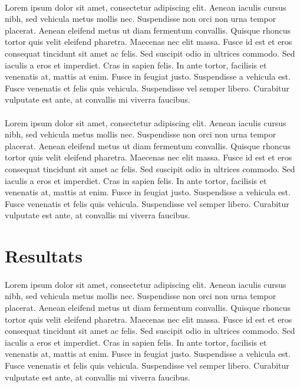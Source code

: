 \documentclass[11pt]{metabo}
\begin{document}
\paragraph{}Lorem ipsum dolor sit amet, consectetur adipiscing elit. Aenean iaculis cursus nibh, sed vehicula metus mollis nec. Suspendisse non orci non urna tempor placerat. Aenean eleifend metus ut diam fermentum convallis. Quisque rhoncus tortor quis velit eleifend pharetra. Maecenas nec elit massa. Fusce id est et eros consequat tincidunt sit amet ac felis. Sed suscipit odio in ultrices commodo. Sed iaculis a eros et imperdiet. Cras in sapien felis. In ante tortor, facilisis et venenatis at, mattis at enim. Fusce in feugiat justo. Suspendisse a vehicula est. Fusce venenatis et felis quis vehicula. Suspendisse vel semper libero. Curabitur vulputate est ante, at convallis mi viverra faucibus.
\paragraph{}Lorem ipsum dolor sit amet, consectetur adipiscing elit. Aenean iaculis cursus nibh, sed vehicula metus mollis nec. Suspendisse non orci non urna tempor placerat. Aenean eleifend metus ut diam fermentum convallis. Quisque rhoncus tortor quis velit eleifend pharetra. Maecenas nec elit massa. Fusce id est et eros consequat tincidunt sit amet ac felis. Sed suscipit odio in ultrices commodo. Sed iaculis a eros et imperdiet. Cras in sapien felis. In ante tortor, facilisis et venenatis at, mattis at enim. Fusce in feugiat justo. Suspendisse a vehicula est. Fusce venenatis et felis quis vehicula. Suspendisse vel semper libero. Curabitur vulputate est ante, at convallis mi viverra faucibus.
\newpage
\section{Resultats}
\paragraph{}Lorem ipsum dolor sit amet, consectetur adipiscing elit. Aenean iaculis cursus nibh, sed vehicula metus mollis nec. Suspendisse non orci non urna tempor placerat. Aenean eleifend metus ut diam fermentum convallis. Quisque rhoncus tortor quis velit eleifend pharetra. Maecenas nec elit massa. Fusce id est et eros consequat tincidunt sit amet ac felis. Sed suscipit odio in ultrices commodo. Sed iaculis a eros et imperdiet. Cras in sapien felis. In ante tortor, facilisis et venenatis at, mattis at enim. Fusce in feugiat justo. Suspendisse a vehicula est. Fusce venenatis et felis quis vehicula. Suspendisse vel semper libero. Curabitur vulputate est ante, at convallis mi viverra faucibus. 
\newpage
\end{document}
